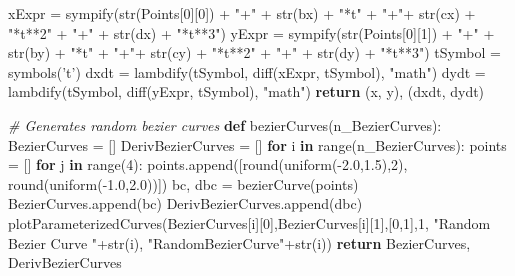 \documentclass[11pt]{article}
\newenvironment{Shaded}{}{}
\newcommand{\KeywordTok}[1]{\textcolor[rgb]{0.00,0.44,0.13}{\textbf{{#1}}}}
\newcommand{\DecValTok}[1]{\textcolor[rgb]{0.25,0.63,0.44}{{#1}}}
\newcommand{\FloatTok}[1]{\textcolor[rgb]{0.25,0.63,0.44}{{#1}}}
\newcommand{\StringTok}[1]{\textcolor[rgb]{0.25,0.44,0.63}{{#1}}}
\newcommand{\CommentTok}[1]{\textcolor[rgb]{0.38,0.63,0.69}{\textit{{#1}}}}
\newcommand{\NormalTok}[1]{{#1}}
\newcommand{\ControlFlowTok}[1]{\textcolor[rgb]{0.00,0.44,0.13}{\textbf{{#1}}}}
\newcommand{\OperatorTok}[1]{\textcolor[rgb]{0.40,0.40,0.40}{{#1}}}
\newcommand{\BuiltInTok}[1]{{#1}}
\begin{document}
\begin{Shaded}
\begin{Highlighting}[]
\NormalTok{    xExpr }\OperatorTok{=}\NormalTok{ sympify(}\BuiltInTok{str}\NormalTok{(Points[}\DecValTok{0}\NormalTok{][}\DecValTok{0}\NormalTok{]) }\OperatorTok{+} \StringTok{"+"} \OperatorTok{+} \BuiltInTok{str}\NormalTok{(bx) }\OperatorTok{+} \StringTok{"*t"} \OperatorTok{+} 
                    \StringTok{"+"}\OperatorTok{+} \BuiltInTok{str}\NormalTok{(cx) }\OperatorTok{+} \StringTok{"*t**2"} \OperatorTok{+} \StringTok{"+"} \OperatorTok{+} \BuiltInTok{str}\NormalTok{(dx) }\OperatorTok{+} \StringTok{"*t**3"}\NormalTok{)}
\NormalTok{    yExpr }\OperatorTok{=}\NormalTok{ sympify(}\BuiltInTok{str}\NormalTok{(Points[}\DecValTok{0}\NormalTok{][}\DecValTok{1}\NormalTok{]) }\OperatorTok{+} \StringTok{"+"} \OperatorTok{+} \BuiltInTok{str}\NormalTok{(by) }\OperatorTok{+} \StringTok{"*t"} \OperatorTok{+} 
                    \StringTok{"+"}\OperatorTok{+} \BuiltInTok{str}\NormalTok{(cy) }\OperatorTok{+} \StringTok{"*t**2"} \OperatorTok{+} \StringTok{"+"} \OperatorTok{+} \BuiltInTok{str}\NormalTok{(dy) }\OperatorTok{+} \StringTok{"*t**3"}\NormalTok{)}
\NormalTok{    tSymbol }\OperatorTok{=}\NormalTok{ symbols(}\StringTok{'t'}\NormalTok{)}
\NormalTok{    dxdt }\OperatorTok{=}\NormalTok{ lambdify(tSymbol, diff(xExpr, tSymbol), }\StringTok{"math"}\NormalTok{)}
\NormalTok{    dydt }\OperatorTok{=}\NormalTok{ lambdify(tSymbol, diff(yExpr, tSymbol), }\StringTok{"math"}\NormalTok{)}
    \ControlFlowTok{return}\NormalTok{ (x, y), (dxdt, dydt)}

\CommentTok{# Generates random bezier curves}
\KeywordTok{def}\NormalTok{ bezierCurves(n_BezierCurves):}
\NormalTok{    BezierCurves }\OperatorTok{=}\NormalTok{ []}
\NormalTok{    DerivBezierCurves }\OperatorTok{=}\NormalTok{ []}
    \ControlFlowTok{for}\NormalTok{ i }\KeywordTok{in} \BuiltInTok{range}\NormalTok{(n_BezierCurves):}
\NormalTok{        points }\OperatorTok{=}\NormalTok{ []}
        \ControlFlowTok{for}\NormalTok{ j }\KeywordTok{in} \BuiltInTok{range}\NormalTok{(}\DecValTok{4}\NormalTok{):}
\NormalTok{            points.append([}\BuiltInTok{round}\NormalTok{(uniform(}\OperatorTok{-}\FloatTok{2.0}\NormalTok{,}\FloatTok{1.5}\NormalTok{),}\DecValTok{2}\NormalTok{), }\BuiltInTok{round}\NormalTok{(uniform(}\OperatorTok{-}\FloatTok{1.0}\NormalTok{,}\FloatTok{2.0}\NormalTok{))])}
\NormalTok{        bc, dbc }\OperatorTok{=}\NormalTok{ bezierCurve(points)}
\NormalTok{        BezierCurves.append(bc)}
\NormalTok{        DerivBezierCurves.append(dbc)}
\NormalTok{        plotParameterizedCurves(BezierCurves[i][}\DecValTok{0}\NormalTok{],BezierCurves[i][}\DecValTok{1}\NormalTok{],[}\DecValTok{0}\NormalTok{,}\DecValTok{1}\NormalTok{],}\DecValTok{1}\NormalTok{,}
                        \StringTok{"Random Bezier Curve "}\OperatorTok{+}\BuiltInTok{str}\NormalTok{(i), }\StringTok{"RandomBezierCurve"}\OperatorTok{+}\BuiltInTok{str}\NormalTok{(i))}
    \ControlFlowTok{return}\NormalTok{ BezierCurves, DerivBezierCurves}
\end{Highlighting}
\end{Shaded}


    
    
    
    
\end{document}
